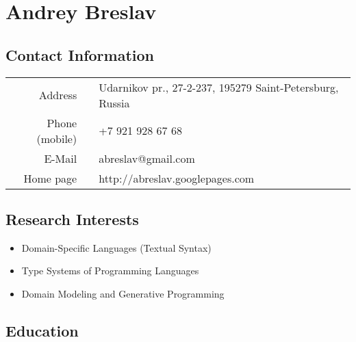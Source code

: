 \documentclass[a4paper, 12pt]{article}
\begin{document}
\section*{Andrey Breslav}

\subsection*{Contact Information}
\begin{tabular}{rll}
	Address &\hspace{10pt}& Udarnikov pr., 27-2-237, 195279 Saint-Petersburg, Russia\\
	Phone (mobile) && +7 921 928 67 68 \\
	E-Mail && abreslav@gmail.com \\
	Home page && http://abreslav.googlepages.com\\
\end{tabular}

\subsection*{Research Interests}
\begin{itemize}
	\item Domain-Specific Languages (Textual Syntax) 
	\item Type Systems of Programming Languages
	\item Domain Modeling and Generative Programming
\end{itemize}

\subsection*{Education}
\end{document}
